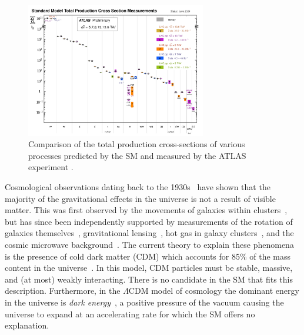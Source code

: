 \begin{figure}
	\centering
	\includegraphics[width=0.7\textwidth]{Figures/standard_model/sm_summary.pdf}
	\caption{Comparison of the total production cross-sections of various processes predicted by the SM and measured by the ATLAS experiment \cite{ATLAS:2024cgh}.}
	\label{fig:sm_precision}
\end{figure}

Cosmological observations dating back to the 1930s~\cite{GalaxyRotation} have shown that the majority of the gravitational effects in the universe is not a result of visible matter.
This was first observed by the movements of galaxies within clusters~\cite{GalaxyRotation}, but has since been independently supported by measurements of the rotation of galaxies themselves~\cite{DistributionDarkMatter, EvidenceDarkMatter,NumericalStudyStability}, gravitational lensing~\cite{GravitationalLensMagnification, Lensing1, Lensing2},
hot gas in galaxy clusters~\cite{HotGas}, and the cosmic microwave background~\cite{Planck2018Results}.
The current theory to explain these phenomena is the presence of cold dark matter (CDM) which accounts for 85\% of the mass content in the universe~\cite{Planck2018Results}.
In this model, CDM particles must be stable, massive, and (at most) weakly interacting.
There is no candidate in the SM that fits this description.
Furthermore, in the $\Lambda$CDM model of cosmology the dominant energy in the universe is \textit{dark energy}~\cite{LCDM1, LCDM2, LCDM3, LCDM4}, a positive pressure of the vacuum causing the universe to expand at an accelerating rate for which the SM offers no explanation.

